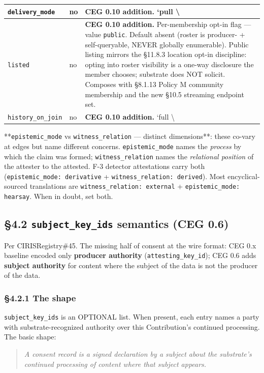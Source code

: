 \documentclass[10pt]{article}
\begin{document}
{\begin{longtable}{|p{5.33cm}|p{5.33cm}|p{5.33cm}|}
\texttt{delivery\_mode} & no & \textbf{CEG 0.10 addition.} `pull \textbackslash{} \\ \hline
\texttt{listed} & no & \textbf{CEG 0.10 addition.} Per-membership opt-in flag — value \texttt{public}. Default absent (roster is producer- + self-queryable, NEVER globally enumerable). Public listing mirrors the §11.8.3 location opt-in discipline: opting into roster visibility is a one-way disclosure the member chooses; substrate does NOT solicit. Composes with §8.1.13 Policy M community membership and the new §10.5 streaming endpoint set. \\ \hline
\texttt{history\_on\_join} & no & \textbf{CEG 0.10 addition.} `full \textbackslash{} \\ \hline
\end{longtable}}


**\texttt{epistemic\_mode} vs \texttt{witness\_relation} — distinct dimensions**: these co-vary at edges but name different concerns. \texttt{epistemic\_mode} names the \textit{process} by which the claim was formed; \texttt{witness\_relation} names the \textit{relational position} of the attester to the attested. F-3 detector attestations carry both (\texttt{epistemic\_mode: derivative} + \texttt{witness\_relation: derived}). Most encyclical-sourced translations are \texttt{witness\_relation: external} + \texttt{epistemic\_mode: hearsay}. When in doubt, set both.


\subsection*{§4.2 \texttt{subject\_key\_ids} semantics (CEG 0.6)}


Per CIRISRegistry\#45. The missing half of consent at the wire format: CEG 0.x baseline encoded only \textbf{producer authority} (\texttt{attesting\_key\_id}); CEG 0.6 adds \textbf{subject authority} for content where the subject of the data is not the producer of the data.


\subsubsection*{§4.2.1 The shape}


\texttt{subject\_key\_ids} is an OPTIONAL list. When present, each entry names a party with substrate-recognized authority over this Contribution's continued processing. The basic shape:


\begin{quote}\itshape A consent record is a signed declaration by a subject about the substrate's continued processing of content where that subject appears.\end{quote}
\end{document}
